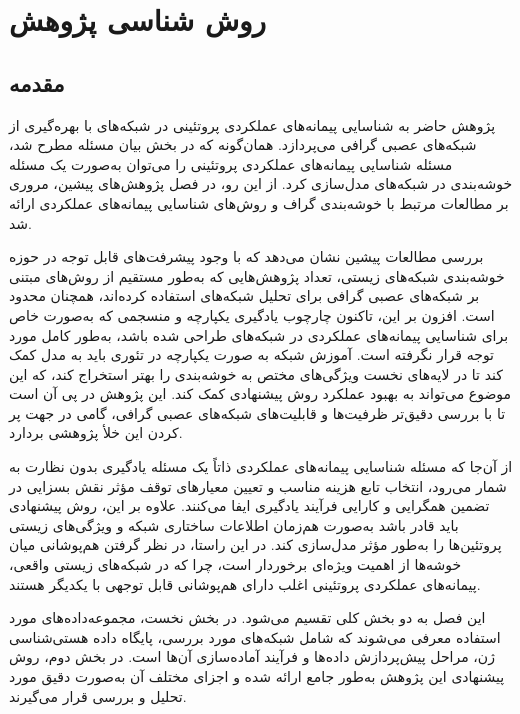 \chapter{روش شناسی پژوهش}

\section{مقدمه}

پژوهش حاضر به شناسایی پیمانه‌های عملکردی پروتئینی در شبکه‌های  با بهره‌گیری از شبکه‌های عصبی گرافی می‌پردازد. همان‌گونه که در بخش بیان مسئله مطرح شد، مسئله شناسایی پیمانه‌های عملکردی پروتئینی را می‌توان به‌صورت یک مسئله خوشه‌بندی در شبکه‌های  مدل‌سازی کرد. از این رو، در فصل پژوهش‌های پیشین، مروری بر مطالعات مرتبط با خوشه‌بندی گراف و روش‌های شناسایی پیمانه‌های عملکردی ارائه شد.

بررسی مطالعات پیشین نشان می‌دهد که با وجود پیشرفت‌های قابل توجه در حوزه خوشه‌بندی شبکه‌های زیستی، تعداد پژوهش‌هایی که به‌طور مستقیم از روش‌های مبتنی بر شبکه‌های عصبی گرافی برای تحلیل شبکه‌های  استفاده کرده‌اند، همچنان محدود است. افزون بر این، تاکنون چارچوب یادگیری یکپارچه و منسجمی که به‌صورت خاص برای شناسایی پیمانه‌های عملکردی در شبکه‌های  طراحی شده باشد، به‌طور کامل مورد توجه قرار نگرفته است. آموزش شبکه به صورت یکپارچه در تئوری باید به مدل کمک کند تا در لایه‌های نخست ویژگی‌های مختص به خوشه‌بندی را بهتر استخراج کند، که این موضوع می‌تواند به بهبود عملکرد روش پیشنهادی کمک کند. این پژوهش در پی آن است تا با بررسی دقیق‌تر ظرفیت‌ها و قابلیت‌های شبکه‌های عصبی گرافی، گامی در جهت پر کردن این خلأ پژوهشی بردارد.

از آن‌جا که مسئله شناسایی پیمانه‌های عملکردی ذاتاً یک مسئله یادگیری بدون نظارت به شمار می‌رود، انتخاب تابع هزینه مناسب و تعیین معیارهای توقف مؤثر نقش بسزایی در تضمین همگرایی و کارایی فرآیند یادگیری ایفا می‌کنند. علاوه بر این، روش پیشنهادی باید قادر باشد به‌صورت هم‌زمان اطلاعات ساختاری شبکه و ویژگی‌های زیستی پروتئین‌ها را به‌طور مؤثر مدل‌سازی کند. در این راستا، در نظر گرفتن هم‌پوشانی میان خوشه‌ها از اهمیت ویژه‌ای برخوردار است، چرا که در شبکه‌های زیستی واقعی، پیمانه‌های عملکردی پروتئینی اغلب دارای هم‌پوشانی قابل توجهی با یکدیگر هستند. 

این فصل به دو بخش کلی تقسیم می‌شود. در بخش نخست، مجموعه‌داده‌های مورد استفاده معرفی می‌شوند که شامل شبکه‌های  مورد بررسی، پایگاه داده هستی‌شناسی ژن، مراحل پیش‌پردازش داده‌ها و فرآیند آماده‌سازی آن‌ها است. در بخش دوم، روش پیشنهادی این پژوهش به‌طور جامع ارائه شده و اجزای مختلف آن به‌صورت دقیق مورد تحلیل و بررسی قرار می‌گیرند.

